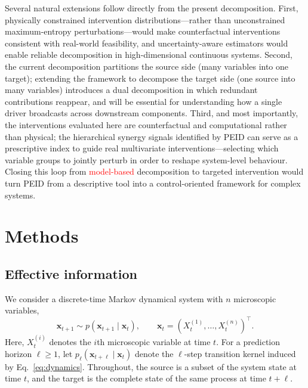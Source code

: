 \documentclass[fleqn,10pt]{wlscirep}
\newcommand{\rev}[1]{\textcolor{red}{#1}}
\theoremstyle{naturetheorem}
\begin{document}
Several natural extensions follow directly from the present decomposition. First, physically constrained intervention distributions---rather than unconstrained maximum-entropy perturbations---would make counterfactual interventions consistent with real-world feasibility, and uncertainty-aware estimators would enable reliable decomposition in high-dimensional continuous systems. Second, the current decomposition partitions the source side (many variables into one target); extending the framework to decompose the target side (one source into many variables) introduces a dual decomposition in which redundant contributions reappear, and will be essential for understanding how a single driver broadcasts across downstream components. Third, and most importantly, the interventions evaluated here are counterfactual and computational rather than physical; the hierarchical synergy signals identified by PEID can serve as a prescriptive index to guide real multivariate interventions---selecting which variable groups to jointly perturb in order to reshape system-level behaviour. Closing this loop from \rev{model-based} decomposition to targeted intervention would turn PEID from a descriptive tool into a control-oriented framework for complex systems.



\section*{Methods}

\subsection*{Effective information}

We consider a discrete-time Markov dynamical system with \(n\) microscopic
variables,
\begin{equation}
    \boldsymbol{x}_{t+1}
    \sim
    p\!\left(
        \boldsymbol{x}_{t+1}\mid\boldsymbol{x}_{t}
    \right),
    \qquad
    \boldsymbol{x}_{t}
    =
    \left(
        X_t^{(1)},\ldots,X_t^{(n)}
    \right)^{\top}.
    \label{eq:dynamics}
\end{equation}
Here, \(X_t^{(i)}\) denotes the \(i\)th microscopic variable at time \(t\).
For a prediction horizon \(\ell\geq1\), let
\(p_{\ell}(\boldsymbol{x}_{t+\ell}\mid\boldsymbol{x}_{t})\) denote the
\(\ell\)-step transition kernel induced by Eq.~\eqref{eq:dynamics}. Throughout,
the source is a subset of the system state at time \(t\), and the target is the
complete state of the same process at time \(t+\ell\).
\end{document}
